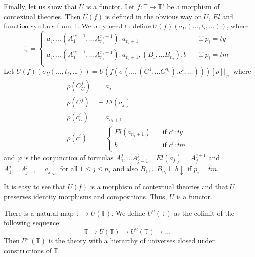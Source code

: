 \documentclass[reqno]{amsart}
\theoremstyle{definition}
\theoremstyle{remark}
\numberwithin{figure}{section}
\begin{document}
\begin{example}
Finally, let us show that $U$ is a functor.
Let $f : \mathbb{T} \to \mathbb{T}'$ be a morphism of contextual theories.
Then $U(f)$ is defined in the obvious way on $U$, $El$ and function symbols from $\mathbb{T}$.
We only need to define $U(f)(\sigma_U(\ldots, t_i, \ldots))$, where
\[ t_i =
  \begin{cases}
    a_1, \ldots (A^{n_i+1}_1, \ldots A^{n_i+1}_{n_i}).\,a_{n_i+1}                               & \quad \text{if } p_i = ty \\
    a_1, \ldots (A^{n_i+1}_1, \ldots A^{n_i+1}_{n_i}).\,a_{n_i+1}, (B_1, \ldots B_{n_i}).\,b    & \quad \text{if } p_i = tm \\
  \end{cases}
\]
Let $U(f)(\sigma_U(\ldots, t_i, \ldots)) = U(f(\sigma(\ldots, (C^1, \ldots C^{n_i}).\,c^i, \ldots)))[\rho]|_\varphi$, where
\begin{align*}
\rho(C^j_U) & = a_j \\
\rho(C^j) & = El(a_j) \\
\rho(c^i_U) & = a_{n_i+1} \\
\rho(c^i) & = 
  \begin{cases}
    El(a_{n_i+1})   & \quad \text{if } c^i : ty \\
    b               & \quad \text{if } c^i : tm \\
  \end{cases}
\end{align*}
and $\varphi$ is the conjunction of formulas $A^j_1, \ldots A^j_{j-1} \vdash El(a_j) = A^{j+1}_j$ and $A^j_1, \ldots A^j_{j-1} \vdash a_j\!\downarrow$ for all $1 \leq j \leq n_i$
and also $B_1, \ldots B_{n_i} \vdash b\!\downarrow$ if $p_i = tm$.

It is easy to see that $U(f)$ is a morphism of contextual theories and that $U$ preserves identity morphisms and compositions.
Thus, $U$ is a functor.
\end{example}

\begin{example}
There is a natural map $\mathbb{T} \to U(\mathbb{T})$.
We define $U^\omega(\mathbb{T})$ as the colimit of the following sequence:
\[ \mathbb{T} \to U(\mathbb{T}) \to U^2(\mathbb{T}) \to \ldots \]
Then $U^\omega(\mathbb{T})$ is the theory with a hierarchy of universes closed under constructions of $\mathbb{T}$.
\end{example}



\end{document}
